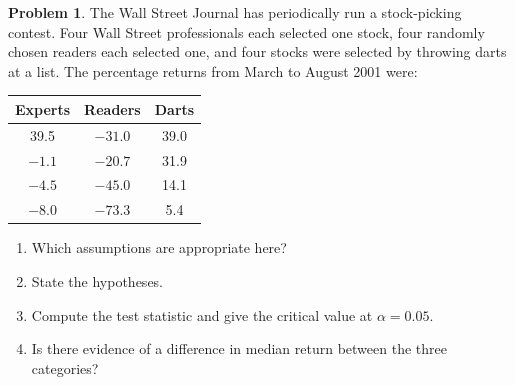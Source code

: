 \documentclass[11pt,a4paper]{article}
\theoremstyle{definition}
\newtheorem{problemx}{Problem}[section]
\newenvironment{problem}{\begin{problemx}}{\end{problemx}}
\begin{document}
\begin{problem}
The Wall Street Journal has periodically run a stock-picking contest. Four Wall
Street professionals each selected one stock, four randomly chosen readers each
selected one, and four stocks were selected by throwing darts at a list. The
percentage returns from March to August 2001 were:
\begin{center}
\begin{tabular}{ccc}
\hline
\textbf{Experts} & \textbf{Readers} & \textbf{Darts}\\
\hline
39.5 & $-31.0$ & 39.0\\
$-1.1$ & $-20.7$ & 31.9\\
$-4.5$ & $-45.0$ & 14.1\\
$-8.0$ & $-73.3$ & 5.4\\
\hline
\end{tabular}
\end{center}
\begin{enumerate}
\item[(a).] Which assumptions are appropriate here?
\item[(b).] State the hypotheses.
\item[(c).] Compute the test statistic and give the critical value at
$\alpha = 0.05$.
\item[(d).] Is there evidence of a difference in median return between the three
categories?
\end{enumerate}
\end{problem}
\end{document}
